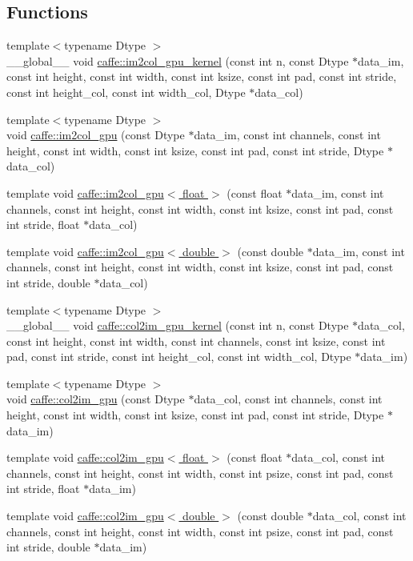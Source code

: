 \subsection*{Functions}
\begin{DoxyCompactItemize}
\item 
{\footnotesize template$<$typename Dtype $>$ }\\\+\_\+\+\_\+global\+\_\+\+\_\+ void \hyperlink{namespacecaffe_a11ed6a7eca37a3810d9dd173cfc1c871}{caffe\+::im2col\+\_\+gpu\+\_\+kernel} (const int n, const Dtype $\ast$data\+\_\+im, const int height, const int width, const int ksize, const int pad, const int stride, const int height\+\_\+col, const int width\+\_\+col, Dtype $\ast$data\+\_\+col)
\item 
{\footnotesize template$<$typename Dtype $>$ }\\void \hyperlink{namespacecaffe_ac27906020365bbdd789307ab27064d28}{caffe\+::im2col\+\_\+gpu} (const Dtype $\ast$data\+\_\+im, const int channels, const int height, const int width, const int ksize, const int pad, const int stride, Dtype $\ast$data\+\_\+col)
\item 
template void \hyperlink{namespacecaffe_a500c953ed9e8940174c8a59b7165b824}{caffe\+::im2col\+\_\+gpu$<$ float $>$} (const float $\ast$data\+\_\+im, const int channels, const int height, const int width, const int ksize, const int pad, const int stride, float $\ast$data\+\_\+col)
\item 
template void \hyperlink{namespacecaffe_aa0f4b89a20fbbfe2f055ea8737b054b4}{caffe\+::im2col\+\_\+gpu$<$ double $>$} (const double $\ast$data\+\_\+im, const int channels, const int height, const int width, const int ksize, const int pad, const int stride, double $\ast$data\+\_\+col)
\item 
{\footnotesize template$<$typename Dtype $>$ }\\\+\_\+\+\_\+global\+\_\+\+\_\+ void \hyperlink{namespacecaffe_a3a26760e107a595c92a0523f7c02928a}{caffe\+::col2im\+\_\+gpu\+\_\+kernel} (const int n, const Dtype $\ast$data\+\_\+col, const int height, const int width, const int channels, const int ksize, const int pad, const int stride, const int height\+\_\+col, const int width\+\_\+col, Dtype $\ast$data\+\_\+im)
\item 
{\footnotesize template$<$typename Dtype $>$ }\\void \hyperlink{namespacecaffe_a4604c45fdbee27b1591a047541218308}{caffe\+::col2im\+\_\+gpu} (const Dtype $\ast$data\+\_\+col, const int channels, const int height, const int width, const int ksize, const int pad, const int stride, Dtype $\ast$data\+\_\+im)
\item 
template void \hyperlink{namespacecaffe_a864bc0e9898dad8473cf1b592c8c1991}{caffe\+::col2im\+\_\+gpu$<$ float $>$} (const float $\ast$data\+\_\+col, const int channels, const int height, const int width, const int psize, const int pad, const int stride, float $\ast$data\+\_\+im)
\item 
template void \hyperlink{namespacecaffe_a9cb148184e75df535d299185583db7dc}{caffe\+::col2im\+\_\+gpu$<$ double $>$} (const double $\ast$data\+\_\+col, const int channels, const int height, const int width, const int psize, const int pad, const int stride, double $\ast$data\+\_\+im)
\end{DoxyCompactItemize}
